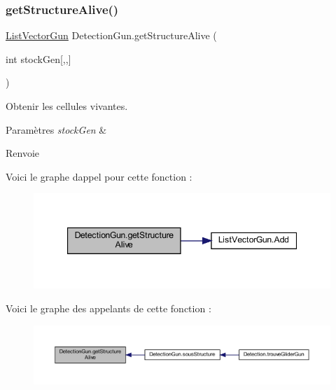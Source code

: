 \subsubsection{\texorpdfstring{get\+Structure\+Alive()}{getStructureAlive()}}
{\footnotesize\ttfamily \mbox{\hyperlink{class_list_vector_gun}{List\+Vector\+Gun}} Detection\+Gun.\+get\+Structure\+Alive (\begin{DoxyParamCaption}\item[{int}]{stock\+Gen\mbox{[},,\mbox{]} }\end{DoxyParamCaption})\hspace{0.3cm}{\ttfamily [inline]}}



Obtenir les cellules vivantes. 


\begin{DoxyParams}{Paramètres}
{\em stock\+Gen} & \\
\hline
\end{DoxyParams}
\begin{DoxyReturn}{Renvoie}

\end{DoxyReturn}
Voici le graphe d\textquotesingle{}appel pour cette fonction \+:\nopagebreak
\begin{figure}[H]
\begin{center}
\leavevmode
\includegraphics[width=347pt]{class_detection_gun_a488d963e0b78922904b6bd42182ca7b1_cgraph}
\end{center}
\end{figure}
Voici le graphe des appelants de cette fonction \+:\nopagebreak
\begin{figure}[H]
\begin{center}
\leavevmode
\includegraphics[width=350pt]{class_detection_gun_a488d963e0b78922904b6bd42182ca7b1_icgraph}
\end{center}
\end{figure}
\mbox{\label{class_detection_gun_af804b47fcbcc2c89bbe17b47eb8f7c47}} 
